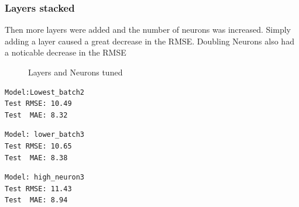 \documentclass[10pt,11pt,12pt,oneside]{book}
\begin{document}
\subsubsection{Layers stacked}
Then more layers were added and the number of neurons was increased. Simply adding a layer caused a great decrease in the RMSE. Doubling Neurons also had a noticable decrease in the RMSE\\
\begin{figure}[H]
    \centering
    \qquad
    \caption{Layers and Neurons tuned}%
    \label{fig:layers}%
\end{figure}
\begin{multicols}{3}
\centering
\begin{verbatim}
Model:Lowest_batch2
Test RMSE: 10.49
Test  MAE: 8.32
\end{verbatim}
\begin{verbatim}
Model: lower_batch3
Test RMSE: 10.65
Test  MAE: 8.38
\end{verbatim}
\begin{verbatim}
Model: high_neuron3
Test RMSE: 11.43
Test  MAE: 8.94
\end{verbatim}
\end{multicols}
\end{document}
